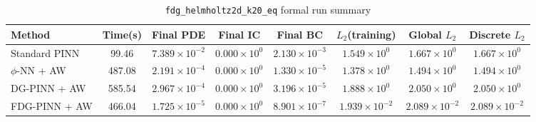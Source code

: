 \begin{table}[h]
\centering
\caption{\texttt{fdg\_helmholtz2d\_k20\_eq} formal run summary}
\begin{adjustbox}{max width=\textwidth}
\scriptsize
\begin{tabular}{lccccccc}
\toprule
Method & Time(s) & Final PDE & Final IC & Final BC & $L_2$(training) & Global $L_2$ & Discrete $L_2$ \\
\midrule
Standard PINN & 99.46 & $7.389\times10^{-2}$ & $0.000\times10^{0}$ & $2.130\times10^{-3}$ & $1.549\times10^{0}$ & $1.667\times10^{0}$ & $1.667\times10^{0}$ \\
$\phi$-NN + AW & 487.08 & $2.191\times10^{-4}$ & $0.000\times10^{0}$ & $1.330\times10^{-5}$ & $1.378\times10^{0}$ & $1.494\times10^{0}$ & $1.494\times10^{0}$ \\
DG-PINN + AW & 585.54 & $2.967\times10^{-4}$ & $0.000\times10^{0}$ & $3.196\times10^{-5}$ & $1.888\times10^{0}$ & $2.050\times10^{0}$ & $2.050\times10^{0}$ \\
FDG-PINN + AW & 466.04 & $1.725\times10^{-5}$ & $0.000\times10^{0}$ & $8.901\times10^{-7}$ & $1.939\times10^{-2}$ & $2.089\times10^{-2}$ & $2.089\times10^{-2}$ \\
\bottomrule
\end{tabular}
\end{adjustbox}
\end{table}
